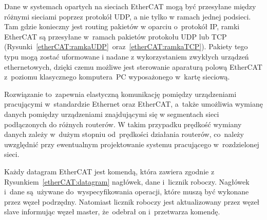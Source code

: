 Dane w systemach opartych na sieciach EtherCAT mogą być przesyłane między różnymi sieciami poprzez protokół UDP, a nie tylko w ramach jednej podsieci. Tam gdzie konieczny jest routing pakietów w oparciu o~protokół IP, ramki EtherCAT są przesyłane w~ramach pakietów protokołu UDP lub TCP (Rysunki~\ref{etherCAT:ramkaUDP}~oraz~\ref{etherCAT:ramkaTCP}). Pakiety tego typu mogą zostać uformowane i nadane z wykorzystaniem zwykłych urządzeń ethernetowych, dzięki czemu możliwe jest sterowanie aparaturą polową EtherCAT z~poziomu klasycznego komputera~PC wyposażonego w~kartę sieciową.

Rozwiązanie to~zapewnia elastyczną komunikację pomiędzy urządzeniami pracującymi w~standardzie Ethernet oraz EtherCAT, a~także umożliwia wymianę danych pomiędzy urządzeniami znajdującymi się w segmentach sieci podłączonych do różnych routerów. W takim przypadku prędkość wymiany danych zależy w~dużym stopniu od~prędkości działania routerów, co~należy uwzględnić przy ewentualnym projektowanie systemu pracującego w~rozdzielonej sieci.

Każdy datagram EtherCAT jest komendą, która zawiera zgodnie z Rysunkiem~\ref{etherCAT:datagram} nagłówek, dane i~licznik roboczy. Nagłówek i~dane są~używane do~wyspecyfikowania operacji, które muszą być wykonane przez węzeł podrzędny. Natomiast licznik roboczy jest aktualizowany przez węzeł slave informując węzeł master, że~odebrał on i~przetwarza komendę.

